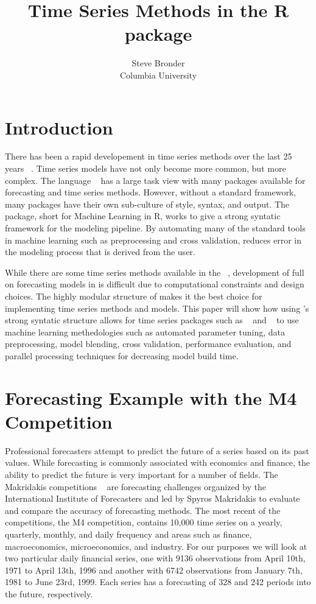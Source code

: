 \documentclass[article]{jss}\usepackage[]{graphicx}\usepackage[]{color}
\author{Steve Bronder\\ Columbia University}
\title{Time Series Methods in the R package \pkg{MLR}}
\begin{document}

\section{Introduction}

There has been a rapid developement in time series methods over the last 25 years ~\cite{Hyndman25}. Time series models have not only become more common, but more complex. The  language ~\cite{Rbase} has a large task view with many packages available for forecasting and time series methods. However, without a standard framework, many packages have their own sub-culture of style, syntax, and output. The  ~\cite{mlr} package, short for Machine Learning in R, works to give a strong syntatic framework for the modeling pipeline. By automating many of the standard tools in machine learning such as preprocessing and cross validation,  reduces error in the modeling process that is derived from the user. 

While there are some time series methods available in the  ~\cite{caret}, development of full on forecasting models in  is difficult due to computational constraints and design choices. The highly modular structure of  makes it the best choice for implementing time series methods and models. This paper will show how using 's strong syntatic structure allows for time series packages such as  ~\cite{HyndForecast} and  ~\cite{rugarch} to use machine learning methedologies such as automated parameter tuning, data preprocessing, model blending, cross validation, performance evaluation, and parallel processing techniques for decreasing model build time.

\section{Forecasting Example with the M4 Competition}

Professional forecasters attempt to predict the future of a series based on its past values. While forecasting is commonly associated with economics and finance, the ability to predict the future is very important for a number of fields.
The Makridakis competitions ~\cite{Makridakis2000451} are forecasting challenges organized by the International Institute of Forecasters and led by Spyros Makridakis to evaluate and compare the accuracy of forecasting methods. The most recent of the competitions, the M4 competition, contains 10,000 time series on a yearly, quarterly, monthly, and daily frequency and areas such as finance, macroeconomics, microeconomics, and industry. For our purposes we will look at two particular daily financial series, one with 9136 observations from April 10th, 1971 to April 13th, 1996 and another with 6742 observations from January 7th, 1981 to June 23rd, 1999. Each series has a forecasting of 328 and 242 periods into the future, respectively.
\end{document}
